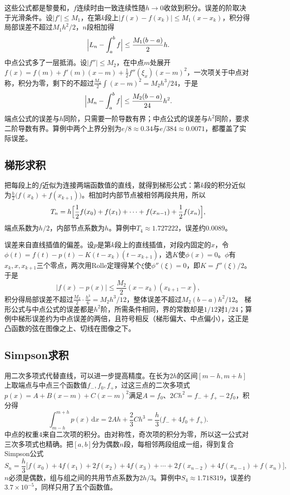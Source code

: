 这些公式都是黎曼和，$f$连续时由一致连续性随$h\to0$收敛到积分。误差的阶取决于光滑条件。设$|f'|\leq M_1$，在第$k$段上$|f(x)-f(x_k)|\leq M_1(x-x_k)$，积分得局部误差不超过$M_1h^2/2$，$n$段相加得
\[
 \Bigl|L_n-\int_a^bf\Bigr|\leq\frac{M_1(b-a)}2h.
\]
中点公式多了一层抵消。设$|f''|\leq M_2$，在中点$m$处展开$f(x)=f(m)+f'(m)(x-m)+\frac12f''(\xi_x)(x-m)^2$，一次项关于中点对称，积分为零，剩下的不超过$\frac{M_2}2\int(x-m)^2=M_2h^3/24$，于是
\[
 \Bigl|M_n-\int_a^bf\Bigr|\leq\frac{M_2(b-a)}{24}h^2.
\]
端点公式的误差与$h$同阶，只需要一阶导数有界；中点公式的误差与$h^2$同阶，要求二阶导数有界。算例中两个上界分别为$e/8\approx0.34$与$e/384\approx0.0071$，都覆盖了实际误差。

\subsection{梯形求积}
\label{sec:ru-trapezoid-rule}

把每段上的$f$近似为连接两端函数值的直线，就得到梯形公式：第$k$段的积分近似为$\frac h2\bigl(f(x_k)+f(x_{k+1})\bigr)$。相加时内部节点被相邻两段共用，所以
\[
 T_n=h\Bigl[\frac12f(x_0)+f(x_1)+\cdots+f(x_{n-1})+\frac12f(x_n)\Bigr],
\]
端点系数为$h/2$，内部节点系数为$h$。算例中$T_4\approx1.727222$，误差约$0.0089$。

误差来自直线插值的偏差。设$p$是第$k$段上的直线插值，对段内固定的$x$，令$\phi(t)=f(t)-p(t)-K(t-x_k)(t-x_{k+1})$，选$K$使$\phi(x)=0$。$\phi$有$x_k,x,x_{k+1}$三个零点，两次用Rolle定理得某个$\xi$使$\phi''(\xi)=0$，即$K=f''(\xi)/2$。于是
\[
 |f(x)-p(x)|\leq\frac{M_2}2(x-x_k)(x_{k+1}-x),
\]
积分得局部误差不超过$\frac{M_2}2\cdot\frac{h^3}6=M_2h^3/12$，整体误差不超过$M_2(b-a)h^2/12$。
梯形公式与中点公式的误差都是$h^2$阶，所需条件相同，界的常数却是$1/12$对$1/24$；算例中梯形误差约为中点误差的两倍，且符号相反（梯形偏大、中点偏小），这正是凸函数的弦在图像之上、切线在图像之下。

\subsection{Simpson求积}
\label{sec:ru-simpson-rule}

用二次多项式代替直线，可以进一步提高精度。在长为$2h$的区间$[m-h,m+h]$上取端点与中点三个函数值$f_-,f_0,f_+$，过这三点的二次多项式$p(x)=A+B(x-m)+C(x-m)^2$满足$A=f_0$、$2Ch^2=f_-+f_+-2f_0$，积分得
\[
 \int_{m-h}^{m+h}p(x)\,\mathrm dx=2Ah+\frac23Ch^3=\frac h3\bigl(f_-+4f_0+f_+\bigr).
\]
中点的权重$4$来自二次项的积分。由对称性，奇次项的积分为零，所以这一公式对三次多项式也精确。把$[a,b]$分为偶数$n$段，每相邻两段组成一组，得到复合Simpson公式
\[
 S_n=\frac h3\bigl[f(x_0)+4f(x_1)+2f(x_2)+4f(x_3)+\cdots+2f(x_{n-2})+4f(x_{n-1})+f(x_n)\bigr],
\]
$n$必须是偶数，组与组之间的共用节点系数为$2h/3$。算例中$S_4\approx1.718319$，误差约$3.7\times10^{-5}$，同样只用了五个函数值。

